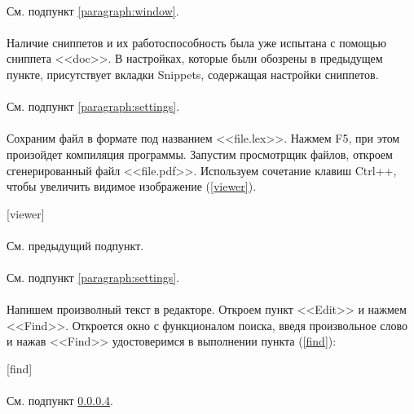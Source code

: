 \documentclass[testmethods]{espd}
\begin{document}
\paragraph{} %
См. подпункт \ref{paragraph:window}.

\paragraph{} %
Наличие сниппетов и их работоспособность была уже испытана с помощью сниппета <<doc>>. В настройках, которые были обозрены в предыдущем пункте, присутствует вкладки Snippets, содержащая настройки сниппетов.

\paragraph{} %
См. подпункт \ref{paragraph:settings}.

\paragraph{}\label{paragraph:saving} %
Сохраним файл в формате под названием <<file.lex>>. Нажмем F5, при этом произойдет компиляция программы. Запустим просмотрщик файлов, откроем сгенерированный файл <<file.pdf>>. Используем сочетание клавиш Ctrl++, чтобы увеличить видимое изображение (\ref{viewer}).

[viewer]

\paragraph{} %
См. предыдущий подпункт.

\paragraph{} %
См. подпункт \ref{paragraph:settings}.

\paragraph{} %
Напишем произволный текст в редакторе. Откроем пункт <<Edit>> и нажмем <<Find>>. Откроется окно с функционалом поиска, введя произвольное слово и нажав <<Find>> удостоверимся в выполнении пункта (\ref{find}):

[find]

\paragraph{} %
См. подпункт \ref{paragraph:saving}.
\end{document}
